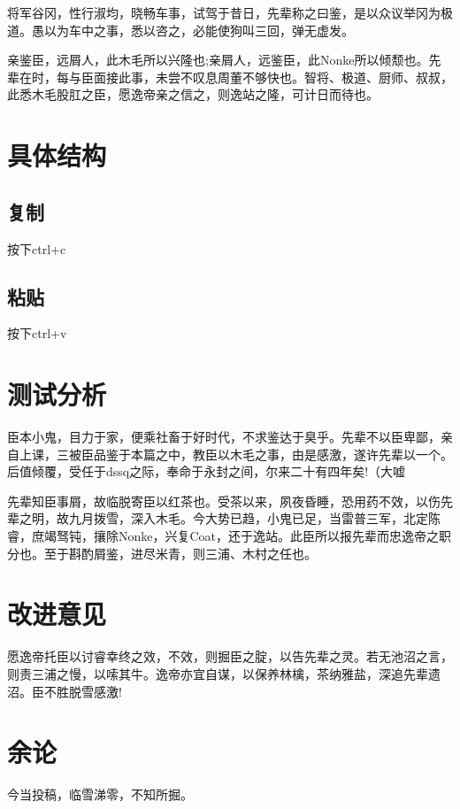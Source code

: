 \documentclass[a4paper,11pt,UTF8,AutoFakeBold= {2.88}]{ctexart}
\begin{document}
将军谷冈，性行淑均，晓畅车事，试驾于昔日，先辈称之曰鉴，是以众议举冈为极道。愚以为车中之事，悉以咨之，必能使狗叫三回，弹无虚发。

亲鉴臣，远屑人，此木毛所以兴隆也;亲屑人，远鉴臣，此Nonke所以倾颓也。先辈在时，每与臣面接此事，未尝不叹息周董不够快也。智将、极道、厨师、叔叔，此悉木毛股肛之臣，愿逸帝亲之信之，则逸站之隆，可计日而待也。

\section{具体结构}

\subsection{复制}

按下ctrl+c

\subsection{粘贴}

按下ctrl+v

\section{测试分析}

臣本小鬼，目力于家，便乘社畜于好时代，不求鉴达于臭乎。先辈不以臣卑鄙，亲自上课，三被臣品鉴于本篇之中，教臣以木毛之事，由是感激，遂许先辈以一个。后值倾覆，受任于dssq之际，奉命于永封之间，尔来二十有四年矣!（大嘘

先辈知臣事屑，故临脱寄臣以红茶也。受茶以来，夙夜昏睡，恐用药不效，以伤先辈之明，故九月拨雪，深入木毛。今大势已趋，小鬼已足，当雷普三军，北定陈睿，庶竭驽钝，攘除Nonke，兴复Coat，还于逸站。此臣所以报先辈而忠逸帝之职分也。至于斟酌屑鉴，进尽米青，则三浦、木村之任也。

\section{改进意见}

愿逸帝托臣以讨睿幸终之效，不效，则掘臣之腚，以告先辈之灵。若无池沼之言，则责三浦之慢，以嗦其牛。逸帝亦宜自谋，以保养林檎，茶纳雅盐，深追先辈遗沼。臣不胜脱雪感激!

\section{余论}

今当投稿，临雪涕零，不知所掘。
\end{document}
